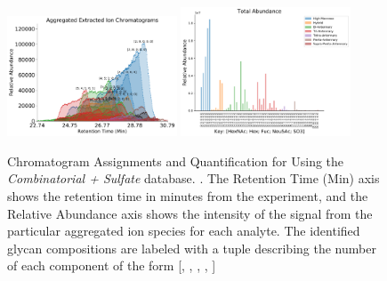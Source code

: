     \hfill
    \begin{figure}[tb]
        \caption{Chromatogram Assignments and Quantification
                 for \philbs Using the \textit{Combinatorial + Sulfate} database.
                 \label{fig:philbs_assignments}. The Retention Time (Min) axis shows
                 the retention time in minutes from the experiment, and the Relative
                 Abundance axis shows the intensity of the signal from the particular
                 aggregated ion species for each analyte. The identified glycan compositions
                 are labeled with a tuple describing the number of each component of the form
                 [, , ,
                  , ]}
        \centering
        \includegraphics[width=0.45\textwidth,valign=t]{figure/sulfated_phil_bs_native_chromatograms.pdf}
        \includegraphics[width=0.45\textwidth,valign=t]{figure/sulfated_phil_bs_native_abundances.pdf}
    \end{figure}
    \hfill

